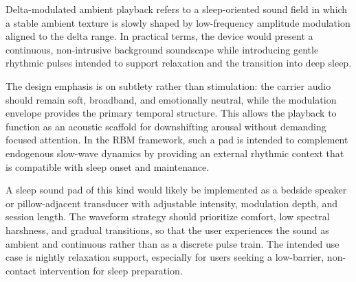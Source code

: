Delta-modulated ambient playback refers to a sleep-oriented sound field in which a stable ambient texture is slowly shaped by low-frequency amplitude modulation aligned to the delta range. In practical terms, the device would present a continuous, non-intrusive background soundscape while introducing gentle rhythmic pulses intended to support relaxation and the transition into deep sleep.

The design emphasis is on subtlety rather than stimulation: the carrier audio should remain soft, broadband, and emotionally neutral, while the modulation envelope provides the primary temporal structure. This allows the playback to function as an acoustic scaffold for downshifting arousal without demanding focused attention. In the RBM framework, such a pad is intended to complement endogenous slow-wave dynamics by providing an external rhythmic context that is compatible with sleep onset and maintenance.

A sleep sound pad of this kind would likely be implemented as a bedside speaker or pillow-adjacent transducer with adjustable intensity, modulation depth, and session length. The waveform strategy should prioritize comfort, low spectral harshness, and gradual transitions, so that the user experiences the sound as ambient and continuous rather than as a discrete pulse train. The intended use case is nightly relaxation support, especially for users seeking a low-barrier, non-contact intervention for sleep preparation.
